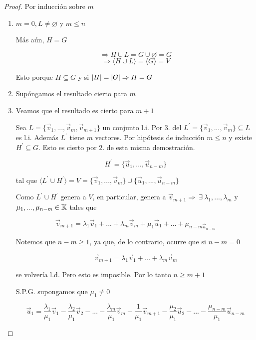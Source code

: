 \begin{proof}
    Por inducción sobre $m$

    \begin{enumerate}
        \item $m=0, L \neq \varnothing$ y $m \leqslant n$

        Más aún, $H=G$

        $$\Rightarrow H \cup L = G \cup \varnothing = G$$
        $$\Rightarrow \langle H \cup L \rangle = \langle G \rangle = V$$

        Esto porque $H \subseteq G$ y si $\abs{H} = \abs{G} \Rightarrow H = G$

        \item Supóngamos el resultado cierto para $m$

        \item Veamos que el resultado es cierto para $m+1$

        Sea $L = \{ \vec{v}_{1},...,\vec{v}_{m},\vec{v}_{m+1} \}$ un conjunto l.i. Por 3. del  $L^\prime = \{ \vec{v}_{1},...,\vec{v}_{m}\} \subseteq L$ es l.i. Además $L^\prime$ tiene $m $ vectores. Por hipótesis de inducción $m \leqslant n$ y existe $H^\prime \subseteq G$. Esto es cierto por 2. de esta misma demostración. 

        $$H^\prime = \{ \vec{u}_{1},...,\vec{u}_{n-m}\}$$

        tal que $\langle L^\prime \cup H^\prime \rangle = V =  \{ \vec{v}_{1},...,\vec{v}_{m}\} \cup \{ \vec{u}_{1},...,\vec{u}_{n-m}\}$

        Como $L^\prime \cup H^\prime$ genera a $V$, en particular, genera a $\vec{v}_{m+1} \Rightarrow \: \exists \: \lambda_1,...,\lambda_m$ y $\mu_1,...,{\mu}_{n-m} \in \mathbb{K}$ tales que

        $$\vec{v}_{m+1} = \lambda_1\vec{v}_{1} + ... + \lambda_m\vec{v}_{m} + \mu_1\vec{u}_{1}+ ... +{\mu}_{n-m\vec{u}_{n-m}}$$

        Notemos que $n-m \geqslant 1$, ya que, de lo contrario, ocurre que si $n-m = 0$

        $$\vec{v}_{m+1} = \lambda_1\vec{v}_{1} + ... + \lambda_m\vec{v}_{m}$$

        se volvería l.d. Pero esto es imposible. Por lo tanto $n \geqslant m+1$

        S.P.G. supongamos que $\mu_1 \neq 0$

        $$ \vec{u}_{1} = \frac{{\lambda}_{1}}{{\mu}_{1}}\vec{v}_{1} - \frac{{\lambda}_{2}}{{\mu}_{1}}\vec{v}_{2} - ... - \frac{{\lambda}_{m}}{{\mu}_{1}}\vec{v}_{m} + \frac{1}{{\mu}_{1}}\vec{v}_{m+1} -  \frac{{\mu}_{2}}{{\mu}_{1}}\vec{u}_{2} - ... - \frac{{\mu}_{n-m}}{{\mu}_{1}}\vec{u}_{n-m}$$


\end{enumerate}
\end{proof}
